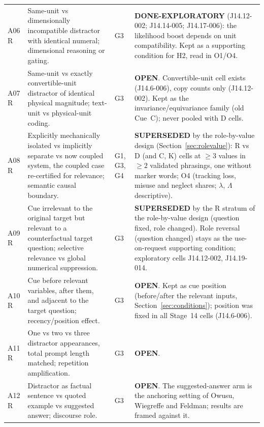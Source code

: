 \documentclass[10pt,a4paper]{article}
\begin{document}
\begin{longtable}{@{}P{1.2cm}P{7.2cm}P{1.3cm}P{5.6cm}@{}}
A06 \newline R & Same-unit vs dimensionally incompatible distractor with identical numeral; dimensional reasoning or gating. & G3 &
\textbf{DONE-EXPLORATORY} (J14.12-002; J14.14-005; J14.17-006): the likelihood boost depends on unit compatibility. Kept as a supporting condition for H2, read in O1/O4. \\
A07 \newline R & Same-unit vs exactly convertible-unit distractor of identical physical magnitude; text-unit vs physical-unit coding. & G3 &
\textbf{OPEN}. Convertible-unit cell exists (J14.6-006), copy counts only (J14.12-002). Kept as the invariance/equivariance family (old Cue~C); never pooled with D cells. \\
A08 \newline R & Explicitly mechanically isolated vs implicitly separate vs now coupled system, the coupled case re-certified for relevance; semantic causal boundary. & G1, G3, G4 &
\textbf{SUPERSEDED} by the role-by-value design (Section~\ref{sec:rolevalue}): R vs D (and C, K) cells at $\geq3$ values in $\geq2$ validated phrasings, one without marker words; O4 (tracking loss, misuse and neglect shares; $\lambda$, $\Lambda$ descriptive). \\
A09 \newline R & Cue irrelevant to the original target but relevant to a counterfactual target question; selective relevance vs global numerical suppression. & G3 &
\textbf{SUPERSEDED} by the R stratum of the role-by-value design (question fixed, role changed). Role reversal (question changed) stays as the use-on-request supporting condition; exploratory cells J14.12-002, J14.19-014. \\
A10 \newline R & Cue before relevant variables, after them, and adjacent to the target question; recency/position effect. & G3 &
\textbf{OPEN}. Kept as cue position (before/after the relevant inputs, Section~\ref{sec:conditions}); position was fixed in all Stage~14 cells (J14.6-006). \\
A11 \newline R & One vs two vs three distractor appearances, total prompt length matched; repetition amplification. & G3 &
\textbf{OPEN}. \\
A12 \newline R & Distractor as factual sentence vs quoted example vs suggested answer; discourse role. & G3 &
\textbf{OPEN}. The suggested-answer arm is the anchoring setting of Owusu, Wiegreffe and Feldman; results are framed against it. \\

\end{longtable}
\end{document}
